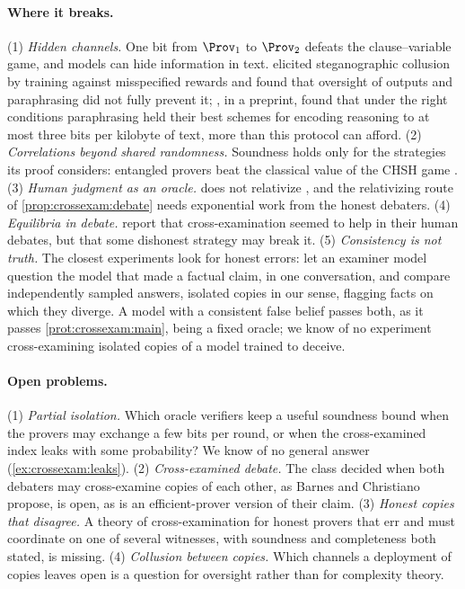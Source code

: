 \begin{refsection}
\paragraph{Where it breaks.} (1) \emph{Hidden channels.} One bit from $\Prov_1$ to $\Prov_2$ defeats the clause--variable game, and models can hide information in text. \Textcite{MathewEtAl2025} elicited steganographic collusion by training against misspecified rewards and found that oversight of outputs and paraphrasing did not fully prevent it; \textcite{RogerGreenblatt2023}, in a preprint, found that under the right conditions paraphrasing held their best schemes for encoding reasoning to at most three bits per kilobyte of text, more than this protocol can afford. (2) \emph{Correlations beyond shared randomness.} Soundness holds only for the strategies its proof considers: entangled provers beat the classical value of the CHSH game \parencite{CleveEtAl2004}. (3) \emph{Human judgment as an oracle.}  does not relativize \parencite{FortnowRompelSipser1994}, and the relativizing route of \cref{prop:crossexam:debate} needs exponential work from the honest debaters. (4) \emph{Equilibria in debate.} \Textcite{BarnesChristiano2020} report that cross-examination seemed to help in their human debates, but that some dishonest strategy may break it. (5) \emph{Consistency is not truth.} The closest experiments look for honest errors: \textcite{CohenEtAl2023} let an examiner model question the model that made a factual claim, in one conversation, and \textcite{ManakulEtAl2023} compare independently sampled answers, isolated copies in our sense, flagging facts on which they diverge. A model with a consistent false belief passes both, as it passes \cref{prot:crossexam:main}, being a fixed oracle; we know of no experiment cross-examining isolated copies of a model trained to deceive.

\paragraph{Open problems.} (1) \emph{Partial isolation.} Which oracle verifiers keep a useful soundness bound when the provers may exchange a few bits per round, or when the cross-examined index leaks with some probability? We know of no general answer (\cref{ex:crossexam:leaks}). (2) \emph{Cross-examined debate.} The class decided when both debaters may cross-examine copies of each other, as Barnes and Christiano propose, is open, as is an efficient-prover version of their claim. (3) \emph{Honest copies that disagree.} A theory of cross-examination for honest provers that err and must coordinate on one of several witnesses, with soundness and completeness both stated, is missing. (4) \emph{Collusion between copies.} Which channels a deployment of copies leaves open is a question for oversight rather than for complexity theory.


\end{refsection}
